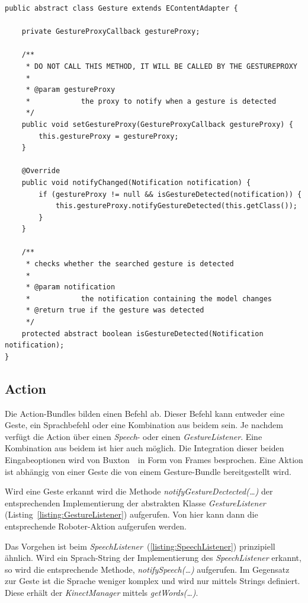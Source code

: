 \begin{lstlisting}[caption={Klasse Gesture}, label={listing:Gesture}]
public abstract class Gesture extends EContentAdapter {

	private GestureProxyCallback gestureProxy;

	/**
	 * DO NOT CALL THIS METHOD, IT WILL BE CALLED BY THE GESTUREPROXY
	 * 
	 * @param gestureProxy
	 *            the proxy to notify when a gesture is detected
	 */
	public void setGestureProxy(GestureProxyCallback gestureProxy) {
		this.gestureProxy = gestureProxy;
	}

	@Override
	public void notifyChanged(Notification notification) {
		if (gestureProxy != null && isGestureDetected(notification)) {
			this.gestureProxy.notifyGestureDetected(this.getClass());
		}
	}

	/**
	 * checks whether the searched gesture is detected
	 * 
	 * @param notification
	 *            the notification containing the model changes
	 * @return true if the gesture was detected
	 */
	protected abstract boolean isGestureDetected(Notification notification);
}
\end{lstlisting}
\par\smallskip

\subsection{Action}
\label{subsec:osgiaction}

Die Action-Bundles bilden einen Befehl ab. Dieser Befehl kann entweder eine Geste, ein Sprachbefehl oder eine Kombination aus beidem sein. 
Je nachdem verf\"ugt die Action \"uber einen \textit{Speech}- oder einen \textit{GestureListener}. Eine Kombination aus beidem ist hier 
auch m\"oglich. Die Integration dieser beiden Eingabeoptionen wird von Buxton~\cite{bib:buxton}~\footnotemark[4] in Form von Frames besprochen. 
Eine Aktion ist abh\"angig von einer Geste die von einem Gesture-Bundle bereitgestellt wird.

Wird eine Geste erkannt wird die Methode \textit{notifyGestureDectected(\ldots)} der entsprechenden Implementierung der abstrakten Klasse
\textit{GestureListener} (Listing~\ref{listing:GestureListener}) aufgerufen. Von hier kann dann die entsprechende Roboter-Aktion aufgerufen werden.

Das Vorgehen ist beim \textit{SpeechListener}~(\ref{listing:SpeechListener}) prinzipiell \"ahnlich. Wird ein Sprach-String der Implementierung
des \textit{SpeechListener} erkannt, so wird die entsprechende Methode, \textit{notifySpeech(\ldots)} aufgerufen. Im Gegensatz zur Geste ist die
Sprache weniger komplex und wird nur mittels Strings definiert. Diese erh\"alt der \textit{KinectManager} mittels \textit{getWords(\ldots)}.

